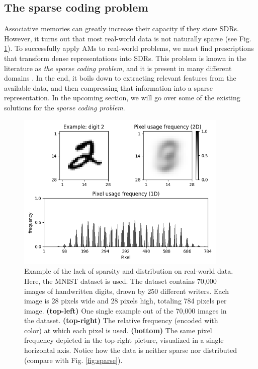 \documentclass[runningheads]{llncs}
\begin{document}
\subsection{The sparse coding problem}
\label{sec:inputoutput_problem}
Associative memories can greatly increase their capacity if they store SDRs. However, it turns out that most real-world data is not naturally sparse (see Fig. \ref{fig:mnist}). To successfully apply AMs to real-world problems, we must find prescriptions that transform dense representations into SDRs. This problem is known in the literature as \textit{the sparse coding problem}, and it is present in many different domains \cite{wright2008robust,yang2010image,zhang2015survey}. In the end, it boils down to extracting relevant features from the available data, and then compressing that information into a sparse representation. In the upcoming section, we will go over some of the existing solutions for the \textit{sparse coding problem}.

\begin{figure}[h]
    \centering
    \includegraphics[width=0.9\textwidth]{img/MNIST.png}
    \caption{ Example of the lack of sparsity and distribution on real-world data. Here, the MNIST dataset \cite{lecun1998mnist} is used. The dataset contains 70,000 images of handwritten digits, drawn by 250 different writers. Each image is 28 pixels wide and 28 pixels high, totaling 784 pixels per image.
    \textbf{(top-left)} One single example out of the 70,000 images in the dataset. 
    \textbf{(top-right)} The relative frequency (encoded with color) at which each pixel is used. 
    \textbf{(bottom)} The same pixel frequency depicted in the top-right picture, visualized in a single horizontal axis. Notice how the data is neither sparse nor distributed (compare with Fig. \ref{fig:sparse}).}
\label{fig:mnist}
\end{figure}
\end{document}
